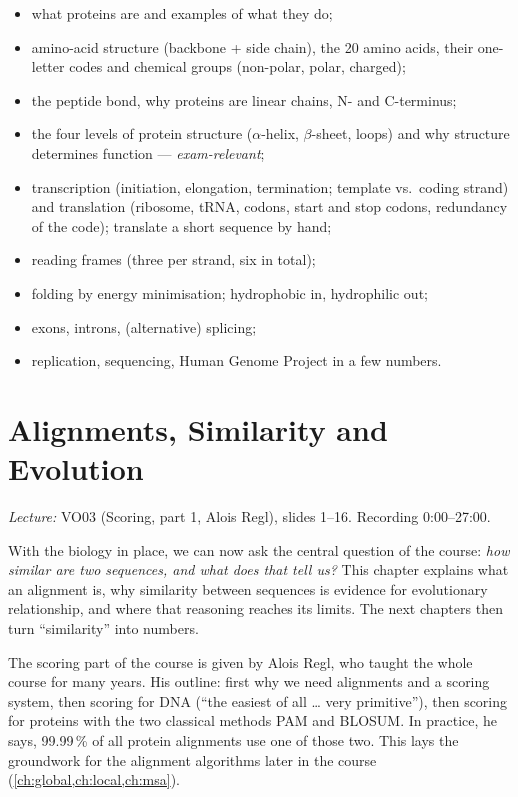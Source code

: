 \documentclass[11pt, oneside]{book}
\newcommand{\lectureref}[1]{%
  \par{\small\color{gray!70!black}\textit{Lecture:} #1}\par}
\begin{document}
\begin{itemize}
  \item what proteins are and examples of what they do;
  \item amino-acid structure (backbone + side chain), the 20 amino acids,
    their one-letter codes and chemical groups (non-polar, polar, charged);
  \item the peptide bond, why proteins are linear chains, N- and C-terminus;
  \item the four levels of protein structure ($\alpha$-helix, $\beta$-sheet,
    loops) and why structure determines function --- \emph{exam-relevant};
  \item transcription (initiation, elongation, termination; template vs.\
    coding strand) and translation (ribosome, tRNA, codons, start and stop
    codons, redundancy of the code); translate a short sequence by hand;
  \item reading frames (three per strand, six in total);
  \item folding by energy minimisation; hydrophobic in, hydrophilic out;
  \item exons, introns, (alternative) splicing;
  \item replication, sequencing, Human Genome Project in a few numbers.
\end{itemize}

\chapter{Alignments, Similarity and Evolution}
\label{ch:alignment}

\lectureref{VO03 (Scoring, part 1, Alois Regl), slides 1--16. Recording
0:00--27:00.}

With the biology in place, we can now ask the central question of the
course: \emph{how similar are two sequences, and what does that tell us?}
This chapter explains what an alignment is, why similarity between sequences
is evidence for evolutionary relationship, and where that reasoning reaches
its limits. The next chapters then turn ``similarity'' into numbers.

The scoring part of the course is given by Alois Regl, who taught the whole
course for many years. His outline: first why we need alignments and a
scoring system, then scoring for DNA (``the easiest of all \ldots{} very
primitive''), then scoring for proteins with the two classical methods PAM
and BLOSUM. In practice, he says, 99.99\,\% of all protein alignments use one
of those two. This lays the groundwork for the alignment algorithms later in
the course (\cref{ch:global,ch:local,ch:msa}).
\end{document}
